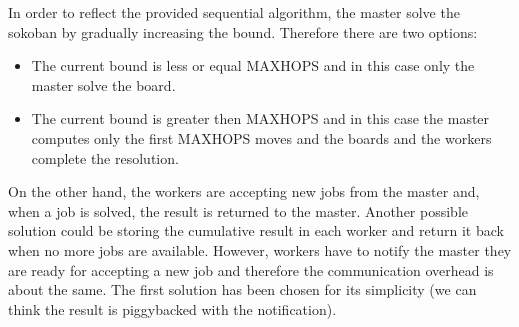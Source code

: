 \documentclass{article}
\begin{document}
In order to reflect the provided sequential algorithm, the master solve the sokoban by gradually increasing the bound. Therefore there are two options:
\begin{itemize}
    \item The current bound is less or equal MAXHOPS and in this case only the master solve the board.
    \item The current bound is greater then MAXHOPS and in this case the master computes only the first MAXHOPS moves and the boards and the workers complete the resolution.
\end{itemize}
On the other hand, the workers are accepting new jobs from the master and, when a job is solved, the result is returned to the master. Another possible solution could be storing the cumulative result in each worker and return it back when no more jobs are available. However, workers have to notify the master they are ready for accepting a new job and therefore the communication overhead is about the same. The first solution has been chosen for its simplicity (we can think the result is piggybacked with the notification).
\end{document}
